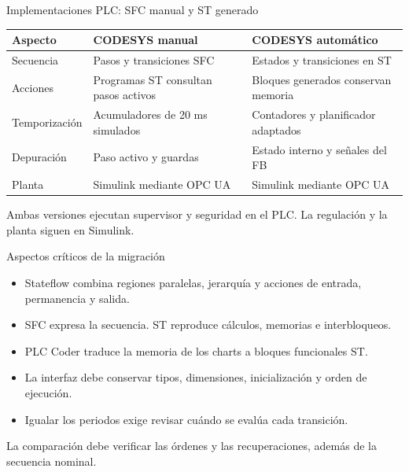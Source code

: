 \documentclass[aspectratio=169,11pt]{beamer}
\begin{document}
\begin{frame}[t,label=slide53]{Implementaciones PLC: SFC manual y ST generado}
\begin{center}{\small\renewcommand{\arraystretch}{1.1}
\begin{tabular}{p{3cm}p{5.1cm}p{5.1cm}}\toprule
Aspecto & CODESYS manual & CODESYS automático\\\midrule
Secuencia & Pasos y transiciones SFC & Estados y transiciones en ST\\
Acciones & Programas ST consultan pasos activos & Bloques generados conservan memoria\\
Temporización & Acumuladores de 20 ms simulados & Contadores y planificador adaptados\\
Depuración & Paso activo y guardas & Estado interno y señales del FB\\
Planta & Simulink mediante OPC UA & Simulink mediante OPC UA\\\bottomrule
\end{tabular}}\end{center}\vfill
Ambas versiones ejecutan supervisor y seguridad en el PLC. La regulación y la planta siguen en Simulink.
\end{frame}
\begin{frame}[t,label=slide54]{Aspectos críticos de la migración}
\begin{itemize}
\item Stateflow combina regiones paralelas, jerarquía y acciones de entrada, permanencia y salida.
\item SFC expresa la secuencia. ST reproduce cálculos, memorias e interbloqueos.
\item PLC Coder traduce la memoria de los charts a bloques funcionales ST.
\item La interfaz debe conservar tipos, dimensiones, inicialización y orden de ejecución.
\item Igualar los periodos exige revisar cuándo se evalúa cada transición.
\end{itemize}\vfill
{\small La comparación debe verificar las órdenes y las recuperaciones, además de la secuencia nominal.}
\end{frame}
\end{document}
